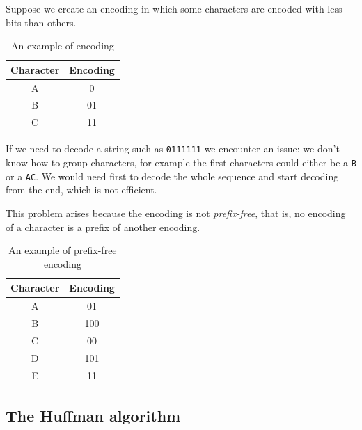 \documentclass[12pt]{extarticle}
\begin{document}
Suppose we create an encoding in which some characters are encoded with less bits than others.

\begin{table}[H]
    \centering
    \begin{tabular}{ |c|c| }
        \hline
        \textbf{Character} & \textbf{Encoding} \\
        \hline
        A                  & 0                 \\
        B                  & 01                \\
        C                  & 11                \\
        \hline
    \end{tabular}
    \caption{An example of encoding}
    \label{tab:encoding_example}
\end{table}

If we need to decode a string such as \texttt{0111111} we encounter an issue: we don't know how to group characters, for example the first characters could either be a \texttt{B} or a \texttt{AC}.
We would need first to decode the whole sequence and start decoding from the end, which is not efficient.

This problem arises because the encoding is not \textit{prefix-free}, that is, no encoding of a character is a prefix of another encoding.

\begin{table}[H]
    \centering
    \begin{tabular}{ |c|c| }
        \hline
        \textbf{Character} & \textbf{Encoding} \\
        \hline
        A                  & 01                \\
        B                  & 100               \\
        C                  & 00                \\
        D                  & 101               \\
        E                  & 11                \\
        \hline
    \end{tabular}

    \caption{An example of prefix-free encoding}
    \label{tab:prefix_free_encoding}
\end{table}

\subsection{The Huffman algorithm}
\end{document}
